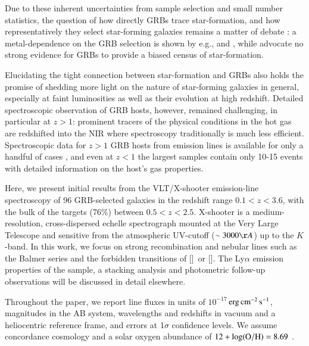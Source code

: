\documentclass[traditabstract, longauth]{aa}
\newcommand{\erg}{$\rm{erg\,cm^{-2}\,s^{-1}}$}
\newcommand{\oh}{12+\log(\rm{O/H})}
\newcommand{\oii}{[\ion{O}{ii}]}
\newcommand{\oiii}{[\ion{O}{iii}]}
\begin{document}
Due to these inherent uncertainties from sample selection and small number statistics, the question of how directly GRBs trace star-formation, and how representatively they select star-forming galaxies remains a matter of debate \citep[e.g.,][]{2012ApJ...755...85M, 2014arXiv1409.7064V, 2015arXiv150304246S}: a metal-dependence on the GRB selection is shown by e.g., \citet{2013ApJ...774..119G} and \citet{2013ApJ...778..128P}, while \citet{2014A&A...565A.112H} advocate no strong evidence for GRBs to provide a biased census of star-formation.
 
Elucidating the tight connection between star-formation and GRBs also holds the promise of shedding more light on the nature of star-forming galaxies in general, especially at faint luminosities as well as their evolution at high redshift. Detailed spectroscopic observation of GRB hosts, however, remained challenging, in particular at $z>1$: prominent tracers of the physical conditions in the hot gas are redshifted into the NIR where spectroscopy traditionally is much less efficient. Spectroscopic data for $z > 1$ GRB hosts from emission lines is available for only a handful of cases \citep[e.g.,][]{2012MNRAS.419.3039C, 2014arXiv1409.6315F, 2015Silviasubm}, and even at $z < 1$ the largest samples \citep{2009ApJ...691..182S, 2010AJ....139..694L, 2013ApJ...774..119G} contain only 10-15 events with detailed information on the host's gas properties.

Here, we present initial results from the VLT/X-shooter emission-line spectroscopy of 96 GRB-selected galaxies in the redshift range $0.1<z<3.6$, with the bulk of the targets (76\%) between $0.5<z<2.5$. X-shooter is a medium-resolution, cross-dispersed echelle spectrograph mounted at the Very Large Telescope \citep{2011A&A...536A.105V} and sensitive from the atmospheric UV-cutoff ($\sim 3000\AA$) up to the $K$-band. In this work, we focus on strong recombination and nebular lines such as the Balmer series and the forbidden transitions of \oii\, or \oiii. The Ly$\alpha$ emission properties of the sample, a stacking analysis and photometric follow-up observations will be discussed in detail elsewhere. 

Throughout the paper, we report line fluxes in units of $10^{-17}\,$\erg, magnitudes in the AB system, wavelengths and redshifts in vacuum and a heliocentric reference frame, and errors at 1$\sigma$ confidence levels. We assume concordance cosmology \citep[][$\Omega_{\rm{m}}=0.315$, $\Omega_\Lambda=0.685$, $H_0=67.3\,\rm{km}\,s^{-1}\, Mpc^{-1}$]{2014A&A...571A..16P} and a solar oxygen abundance of $\oh=8.69$ \citep{2009ARA&A..47..481A}.
\end{document}
